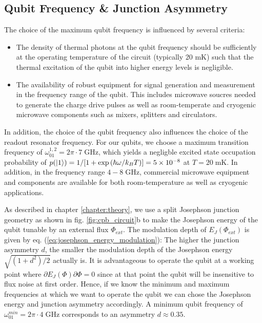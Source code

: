 \subsection{Qubit Frequency \& Junction Asymmetry}

The choice of the maximum qubit frequency is influenced by several criteria:

\begin{itemize}
\item The density of thermal photons at the qubit frequency should be sufficiently at the operating temperature of the circuit (typically 20 mK) such that the thermal excitation of the qubit into higher energy levels is negligible.
\item The availability of robust equipment for signal generation and measurement in the frequency range of the qubit. This includes microwave soucres needed to generate the charge drive pulses as well as room-temperate and cryogenic microwave components such as mixers, splitters and circulators.
\end{itemize}

In addition, the choice of the qubit frequency also influences the choice of the readout resonator frequency. For our qubits, we choose a maximum transition frequency of $\omega_{01}^{1,2}= 2\pi \cdot 7 \;\mathrm{GHz}$, which yields a negligble excited state occupation probability of $p(\left| 1 \right>)=1/[1+\exp{(\hbar \omega / k_B T)}]=5\times 10^{-8}$ at $T=20\;\mathrm{mK}$. In addition, in the frequency range $4-8\;\mathrm{GHz}$, commercial microwave equipment and components are available for both room-temperature as well as cryogenic applications.

\smallskip

As described in chapter \ref{chapter:theory}, we use a split Josephson junction geometry as shown in fig. \ref{fig:cpb_circuit}b to make the Josephson energy of the qubit tunable by an external flux $\Phi_{ext}$. The modulation depth of $E_J(\Phi_{ext})$ is given by eq. (\ref{eq:josephson_energy_modulation}): The higher the junction asymmetry $d$, the smaller the modulation depth of the Josephson energy $\sqrt{(1+d^2)/2}$ actually is. It is advantageous to operate the qubit at a working point where $\partial E_J(\Phi)\partial \Phi=0$ since at that point the qubit will be insensitive to flux noise at first order. Hence, if we know the minimum and maximum frequencies at which we want to operate the qubit we can chose the Josephson energy and junction asymmetry accordingly. A minimum qubit frequency of $\omega_{01}^{min}=2\pi\cdot 4\;\mathrm{GHz}$ corresponds to an asymmetry $d\approx 0.35$.

